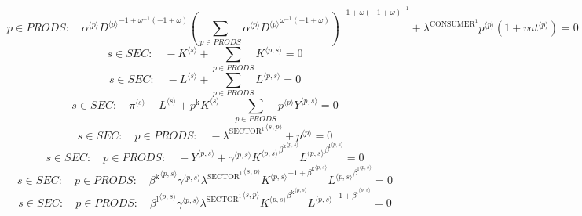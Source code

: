 \begin{equation}
p\in {P\!R\!O\!D\!S}\colon\quad {{\alpha}^{\langle p\rangle}} {{{D}^{\langle p\rangle}}^{-1 + {\omega}^{-1} \left(-1 + \omega\right)}} {\left(\sum_{p\in {P\!R\!O\!D\!S}} {{\alpha}^{\langle p\rangle}} {{{D}^{\langle p\rangle}}^{{\omega}^{-1} \left(-1 + \omega\right)}}\right)^{-1 + {\omega} \left(-1 + \omega\right)^{-1}}} + {\lambda^{\mathrm{CONSUMER}^{\mathrm{1}}}} {{p}^{\langle p\rangle}} \left(1 + {{v\!a\!t}}^{\langle p\rangle}\right) = 0
\end{equation}
\begin{equation}
s\in {S\!E\!C}\colon\quad -{K}^{\langle s\rangle} + \sum_{p\in {P\!R\!O\!D\!S}} {K}^{\langle p,s\rangle} = 0
\end{equation}
\begin{equation}
s\in {S\!E\!C}\colon\quad -{L}^{\langle s\rangle} + \sum_{p\in {P\!R\!O\!D\!S}} {L}^{\langle p,s\rangle} = 0
\end{equation}
\begin{equation}
s\in {S\!E\!C}\colon\quad {\pi}^{\langle s\rangle} + {L}^{\langle s\rangle} + {p^{\mathrm{k}}} {{K}^{\langle s\rangle}} - \sum_{p\in {P\!R\!O\!D\!S}} {{p}^{\langle p\rangle}} {{Y}^{\langle p,s\rangle}} = 0
\end{equation}
\begin{equation}
s\in {S\!E\!C}\colon\quad p\in {P\!R\!O\!D\!S}\colon\quad -{\lambda^{\mathrm{SECTOR}^{\mathrm{1}}}}^{\langle s,p\rangle} + {p}^{\langle p\rangle} = 0
\end{equation}
\begin{equation}
s\in {S\!E\!C}\colon\quad p\in {P\!R\!O\!D\!S}\colon\quad -{Y}^{\langle p,s\rangle} + {{\gamma}^{\langle p,s\rangle}} {{{K}^{\langle p,s\rangle}}^{{\beta^{\mathrm{k}}}^{\langle p,s\rangle}}} {{{L}^{\langle p,s\rangle}}^{{\beta^{\mathrm{l}}}^{\langle p,s\rangle}}} = 0
\end{equation}
\begin{equation}
s\in {S\!E\!C}\colon\quad p\in {P\!R\!O\!D\!S}\colon\quad {{\beta^{\mathrm{k}}}^{\langle p,s\rangle}} {{\gamma}^{\langle p,s\rangle}} {{\lambda^{\mathrm{SECTOR}^{\mathrm{1}}}}^{\langle s,p\rangle}} {{{K}^{\langle p,s\rangle}}^{-1 + {\beta^{\mathrm{k}}}^{\langle p,s\rangle}}} {{{L}^{\langle p,s\rangle}}^{{\beta^{\mathrm{l}}}^{\langle p,s\rangle}}} = 0
\end{equation}
\begin{equation}
s\in {S\!E\!C}\colon\quad p\in {P\!R\!O\!D\!S}\colon\quad {{\beta^{\mathrm{l}}}^{\langle p,s\rangle}} {{\gamma}^{\langle p,s\rangle}} {{\lambda^{\mathrm{SECTOR}^{\mathrm{1}}}}^{\langle s,p\rangle}} {{{K}^{\langle p,s\rangle}}^{{\beta^{\mathrm{k}}}^{\langle p,s\rangle}}} {{{L}^{\langle p,s\rangle}}^{-1 + {\beta^{\mathrm{l}}}^{\langle p,s\rangle}}} = 0
\end{equation}



